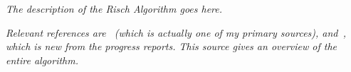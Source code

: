 \emph{The description of the Risch Algorithm goes here.}

\emph{Relevant references are~\cite{bronstein2005symbolic} (which is
actually one of my primary sources), and~\cite{bronstein1998symbolic},
which is new from the progress reports.  This source gives an overview
of the entire algorithm.  }
